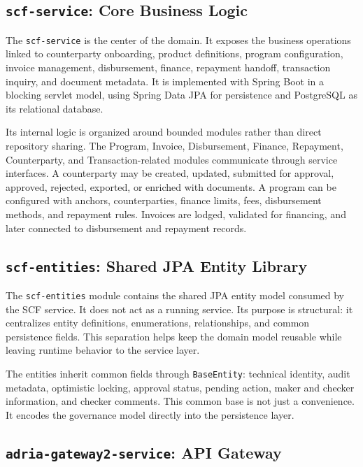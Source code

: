 \subsection{\texttt{scf-service}: Core Business Logic}
\label{subsec:scf_service}

The \texttt{scf-service} is the center of the domain. It exposes the business operations linked to counterparty onboarding, product definitions, program configuration, invoice management, disbursement, finance, repayment handoff, transaction inquiry, and document metadata. It is implemented with Spring Boot in a blocking servlet model, using Spring Data JPA for persistence and PostgreSQL as its relational database.

Its internal logic is organized around bounded modules rather than direct repository sharing. The Program, Invoice, Disbursement, Finance, Repayment, Counterparty, and Transaction-related modules communicate through service interfaces. A counterparty may be created, updated, submitted for approval, approved, rejected, exported, or enriched with documents. A program can be configured with anchors, counterparties, finance limits, fees, disbursement methods, and repayment rules. Invoices are lodged, validated for financing, and later connected to disbursement and repayment records.

\subsection{\texttt{scf-entities}: Shared JPA Entity Library}
\label{subsec:scf_entities}

The \texttt{scf-entities} module contains the shared JPA entity model consumed by the SCF service. It does not act as a running service. Its purpose is structural: it centralizes entity definitions, enumerations, relationships, and common persistence fields. This separation helps keep the domain model reusable while leaving runtime behavior to the service layer.

The entities inherit common fields through \texttt{BaseEntity}: technical identity, audit metadata, optimistic locking, approval status, pending action, maker and checker information, and checker comments. This common base is not just a convenience. It encodes the governance model directly into the persistence layer.

\subsection{\texttt{adria-gateway2-service}: API Gateway}
\label{subsec:gateway_service}

